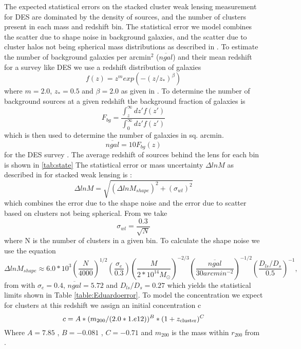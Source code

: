 The expected statistical errors on the stacked cluster weak lensing
measurement for DES are dominated by the density of sources, and the 
number of clusters present in each mass and redshift bin. The statistical error we model
combines the scatter due to shape noise in background galaxies, and the
scatter due to cluster halos not being spherical mass distributions as
described in \citep{obscos, mbecker}. To estimate the number of background galaxies per arcmin$^2$ ($\overline{ngal}$)
and their mean redshift for a survey like DES we use a redshift 
distribution of galaxies 
\begin{equation}
f(z) = z^m exp(-( z/z_* )^{\beta}) 
\end{equation}
where $m=2.0 $, $z_*=0.5$ and $\beta = 2.0 $ as given in
\citep{obscos}. To determine the number of background sources at a
given redshift the background fraction of galaxies is
\begin{equation}
F_{bg} = \frac{\int_z^{\infty} dz' f(z')}{\int_0^{\infty} dz' f(z')}
\end{equation}
which is then used to determine the number of galaxies in sq. arcmin.
\begin{equation}
\overline{ngal}  = 10 F_{bg}(z)
\end{equation}
for the DES survey \citep{edr}. The average redshift of sources
behind the lens for each bin is shown in \ref{tab:state}
\indent
The statistical error or mass uncertainty $\Delta  ln M $ as
described in \citet{obscos} for stacked weak lensing is :
\begin{equation}
\Delta ln M = \sqrt{ (\Delta  ln  M_{shape})^2 +
(\sigma_{wl} )^2 }
\end{equation}
which combines the error due to the shape noise and the error due to
scatter based on clusters not being spherical. From \citep{mbecker}
we take
\begin{equation}
\sigma_{wl} = \frac{0.3}{\sqrt{N}}
\end{equation}
where N is the number of clusters in a given bin. To calculate the
shape noise we use the equation
\begin{equation}
\Delta  ln  M_{shape} \approx 6.0*10^3
(\frac{N}{4000})^{1/2}(\frac{\sigma_e}{0.3})(\frac{M}{2*10^{14}
M_{\odot}})^{-2/3} (\frac{\overline{ngal}}{30 
arcmin^{-2}})^{-1/2}(\frac{D_{ls}/D_{s}}{0.5})^{-1},
\end{equation}
from \citep{obscos} with $\sigma_e = 0.4$, $\overline{ngal} = 5.72$ 
and $D_{ls}/D_{s} = 0.27$ which yields the statistical limits shown in 
Table \ref{table:Eduardoerror}. To model the concentration we expect
for clusters at this redshift we assign an initial concentration c
\begin{equation}
c= A*( m_{200}/(2.0*1.e12))^{B}*(1 + z_{\rm{cluster}})^{C}
\end{equation}
Where  $ A = 7.85 $ ,  $ B = -0.081 $ , $ C= -0.71 $ and $m_{200}$ is
the mass within $r_{200}$ from \citep{oguri}.

